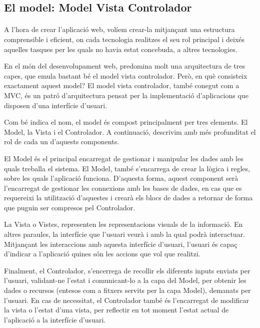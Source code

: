 \subsection{El model: Model Vista Controlador}

    \paragraph{}
    A l'hora de crear l’aplicació web, volíem crear-la mitjançant una estructura comprensible i eficient, on cada tecnologia realitzes el seu rol principal i deixés aquelles tasques per les quals no havia estat concebuda, a altres tecnologies.

    En el món del desenvolupament web, predomina molt una arquitectura de tres capes, que emula bastant bé el model vista controlador. Però, en què consisteix exactament aquest model? El model vista controlador, també conegut com a MVC, és un patró d'arquitectura pensat per la implementació d'aplicacions que disposen d’una interfície d'usuari.

    Com bé indica el nom, el model és compost principalment per tres elements. El Model, la Vista i el Controlador. A continuació, descrivim amb més profunditat el rol de cada un d’aquests components.

    El Model és el principal encarregat de gestionar i manipular les dades amb les quals treballa el sistema. El Model, també s’encarrega de crear la lògica i regles, sobre les quals l'aplicació funciona. D’aquesta forma, aquest component serà l’encarregat de gestionar les connexions amb les bases de dades, en cas que es requereixi la utilització d’aquestes i crearà els blocs de dades a retornar de forma que puguin ser compresos pel Controlador.

    La Vista o Vistes, representen les representacions visuals de la informació. En altres paraules, la interfície que l’usuari veurà i amb la qual podrà interactuar. Mitjançant les interaccions amb aquesta interfície d'usuari, l'usuari és capaç d’indicar a l’aplicació quines són les accions que vol que realitzi.

    Finalment, el Controlador, s'encerrega de recollir els diferents inputs enviats per l'usuari, validant-ne l'estat i comunicant-lo a la capa del Model, per obtenir les dades o recursos (entesos com a fitxers servits per la capa Model), demanats per l’usuari. En cas de necessitat, el Controlador també és l’encarregat de modificar la vista o l’estat d’una vista, per reflectir en tot moment l’estat actual de l’aplicació a la interfície d’usuari.

